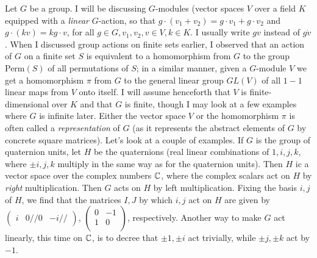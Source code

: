 \documentclass[10pt]{article}
\begin{document}
Let $G$ be a group. I will be discussing $G$-modules (vector spaces $V$
over a field $K$ equipped with a {\sl linear} $G$-action, so that
$g\cdot (v_1 + v_2) = g\cdot v_1 + g\cdot v_2$ and $g\cdot (kv) =
kg\cdot v$, for all $g\in G, v_1,v_2,v\in V, k\in K$. I usually write
$gv$ instead of $g\dot v$. When I discussed group actions on finite sets
earlier, I observed that an action of $G$ on a finite set $S$ is
equivalent to a homomorphism from $G$ to the group Perm$(S)$ of all
permutations of $S$; in a similar manner, given a $G$-module $V$ we get
a homomorphism $\pi$ from $G$ to the general linear group $GL(V)$ of all
$1-1$ linear maps from $V$ onto itself. I will assume henceforth that
$V$ is finite-dimensional over $K$ and that $G$ is finite, though I may
look at a few examples where $G$ is infinite later. Either the vector
space $V$ or the homomorphism $\pi$ is often called a {\sl
  representation} of $G$ (as it represents the abstract elements of $G$
by concrete square matrices). Let's look at a couple of examples. If $G$
is the group of quaternion units, let $H$ be the quaternions (real
linear combinations of $1,i,j,k$, where $\pm i,j,k$ multiply in the same
way as for the quaternion units). Then $H$ ic a vector space over the
complex numbers $\Bbb C$, where the complex scalars act on $H$ by {\sl
  right} multiplication. Then $G$ acts on $H$ by left multiplication.
Fixing the basis $i,j$ of $H$, we find that the matrices $I,J$ by which
$i,j$ act on $H$ are given by $\begin{pmatrix} i&0// 0&
  -i// \end{pmatrix}$, $\begin{pmatrix} 0&-1\\ 1&0\\ \end{pmatrix}$,
respectively. Another way to make $G$ act linearly, this time on $\Bbb
C$, is to decree that $\pm 1,\pm i$ act trivially, while $\pm j,\pm k$
act by $-1$.
\end{document}

